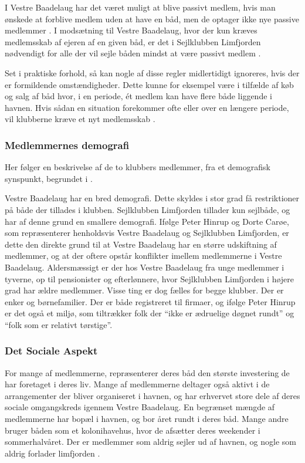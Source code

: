 I Vestre Baadelaug har det været muligt at blive passivt medlem, hvis man ønskede at forblive medlem uden at have en båd, men de optager ikke nye passive medlemmer \cite{vestre_vedtagter}. I modsætning til Vestre Baadelaug, hvor der kun kræves medlemsskab af ejeren af en given båd, er det i Sejlklubben Limfjorden nødvendigt for alle der vil sejle båden mindst at være passivt medlem \cite{int_vb_sl}.

Set i praktiske forhold, så kan nogle af disse regler midlertidigt ignoreres, hvis der er formildende omstændigheder. Dette kunne for eksempel være i tilfælde af køb og salg af båd hvor, i en periode, ét medlem kan have flere både liggende i havnen. Hvis sådan en situation forekommer ofte eller over en længere periode, vil klubberne kræve et nyt medlemsskab \cite{int_vb_sl}.

\subsubsection{Medlemmernes demografi}

Her følger en beskrivelse af de to klubbers medlemmer, fra et demografisk synspunkt, begrundet i \cite{int_vb_sl}.

Vestre Baadelaug har en bred demografi. Dette skyldes i stor grad få restriktioner på både der tillades i klubben. Sejlklubben Limfjorden tillader kun sejlbåde, og har af denne grund en smallere demografi. Ifølge Peter Hinrup og Dorte Carøe, som repræsenterer henholdsvis Vestre Baadelaug og Sejlklubben Limfjorden, er dette den direkte grund til at Vestre Baadelaug har en større udskiftning af medlemmer, og at der oftere opstår konflikter imellem medlemmerne i Vestre Baadelaug. Aldersmæssigt er der hos Vestre Baadelaug fra unge medlemmer i tyverne, op til pensionister og efterlønnere, hvor Sejlklubben Limfjorden i højere grad har ældre medlemmer. Visse ting er dog fælles for begge klubber. Der er enker og børnefamilier. Der er både registreret til firmaer, og ifølge Peter Hinrup er det også et miljø, som tiltrækker folk der \enquote{ikke er ædruelige døgnet rundt} og \enquote{folk som er relativt tørstige}.

\subsubsection{Det Sociale Aspekt}

For mange af medlemmerne, repræsenterer deres båd den største investering de har foretaget i deres liv. Mange af medlemmerne deltager også aktivt i de arrangementer der bliver organiseret i havnen, og har erhvervet store dele af deres sociale omgangskreds igennem Vestre Baadelaug. En begrænset mængde af medlemmerne har bopæl i havnen, og bor året rundt i deres båd. Mange andre bruger båden som et kolonihavehus, hvor de afsætter deres weekender i sommerhalvåret. Der er medlemmer som aldrig sejler ud af havnen, og nogle som aldrig forlader limfjorden \cite{int_vb_sl}.


